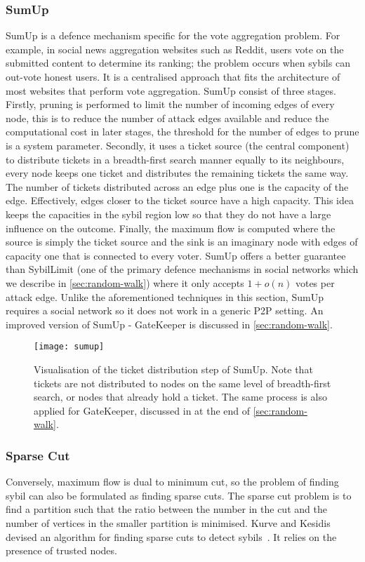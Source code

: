 \subsubsection{SumUp}
SumUp\cite{tran2009sybil} is a defence mechanism specific for the vote
aggregation problem. For example, in social news aggregation websites such as
Reddit, users vote on the submitted content to determine its ranking; the
problem occurs when sybils can out-vote honest users. It is a centralised
approach that fits the architecture of most websites that perform vote
aggregation. SumUp consist of three stages. Firstly, pruning is performed to
limit the number of incoming edges of every node, this is to reduce the number
of attack edges available and reduce the computational cost in later stages, the
threshold for the number of edges to prune is a system parameter. Secondly, it
uses a ticket source (the central component) to distribute tickets in a
breadth-first search manner equally to its neighbours, every node keeps one
ticket and distributes the remaining tickets the same way. The number of tickets
distributed across an edge plus one is the capacity of the edge. Effectively,
edges closer to the ticket source have a high capacity. This idea keeps the
capacities in the sybil region low so that they do not have a large influence on
the outcome. Finally, the maximum flow is computed where the source is simply
the ticket source and the sink is an imaginary node with edges of capacity one
that is connected to every voter. SumUp offers a better guarantee than
SybilLimit (one of the primary defence mechanisms in social networks which we
describe in \autoref{sec:random-walk}) where it only accepts $1 + o(n)$ votes
per attack edge. Unlike the aforementioned techniques in this section, SumUp
requires a social network so it does not work in a generic P2P setting. An
improved version of SumUp - GateKeeper is discussed in
\autoref{sec:random-walk}.

\begin{figure}
  \centering
  \texttt{[image: sumup]}
  \caption{Visualisation of the ticket distribution step of SumUp. Note that
    tickets are not distributed to nodes on the same level of breadth-first
    search, or nodes that already hold a ticket. The same process is also
    applied for GateKeeper, discussed in at the end of
    \autoref{sec:random-walk}.}
  \label{fig:sumup}
\end{figure}

\subsubsection{Sparse Cut}
Conversely, maximum flow is dual to minimum cut, so the problem of finding sybil
can also be formulated as finding sparse cuts. The sparse cut problem is to find
a partition such that the ratio between the number in the cut and the number of
vertices in the smaller partition is minimised. Kurve and Kesidis devised an
algorithm for finding sparse cuts to detect sybils~\cite{kurve2011sybil}. It
relies on the presence of trusted nodes.

